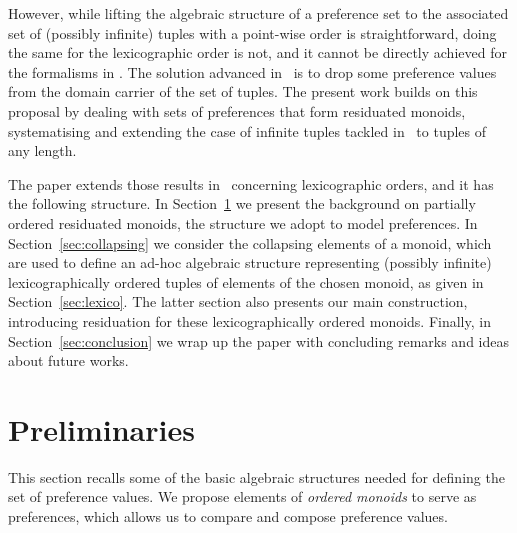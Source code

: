 \documentclass[a4paper]{elsarticle}
\newcommand{\1}{\mathbf{1}}
\begin{document}
%
However, while lifting the algebraic structure of a preference set to the associated set of (possibly infinite) tuples with a point-wise order is straightforward, 
doing the same for the lexicographic order is not, and it cannot be directly achieved for the formalisms in \cite{jacm97,schiex}. 
%
The solution advanced in~\cite{GadducciHMW13,valuation} is to drop some preference values from the domain carrier of the set of tuples. 
%
The present work builds on
this proposal by dealing with sets of preferences that form residuated monoids, systematising and extending the case of infinite tuples tackled in~\cite{sca} 
to tuples of any length.


The paper extends those results in~\cite{jelia2021} concerning lexicographic orders, and it has the following structure. 
In Section~\ref{sec:om} we present  the background on partially ordered residuated monoids, the structure 
we adopt to model preferences. 
%
In Section~\ref{sec:collapsing} we consider the collapsing elements of a monoid, which are used to define an ad-hoc algebraic structure representing 
(possibly infinite) lexicographically ordered tuples of elements of the chosen monoid, as given in Section~\ref{sec:lexico}. 
The latter section also presents our main construction, introducing residuation for these lexicographically ordered monoids.  
Finally, in Section~\ref{sec:conclusion} we wrap up the paper with concluding remarks and ideas about future works.
%

\section{Preliminaries}\label{sec:om}


This section recalls some of the basic algebraic structures needed for defining
the set of preference values. We propose elements of \emph{ordered monoids} 
to serve as preferences, which allows us to compare and compose preference values.
\end{document}
